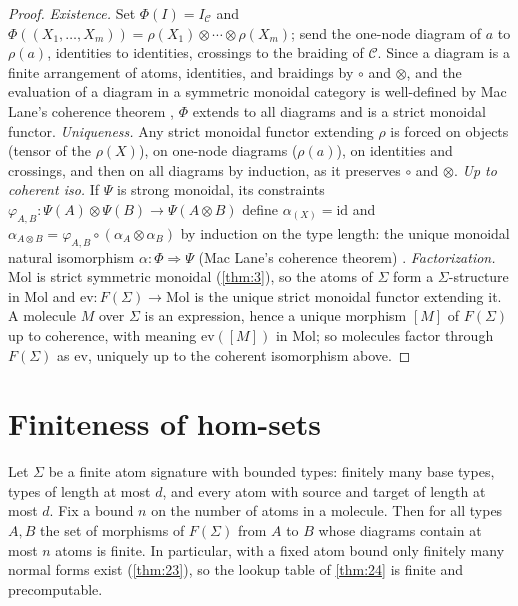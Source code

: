 \begin{proof}
\emph{Existence.} Set $\Phi (I) = I_{\mathcal{C}}$ and
$\Phi ((X_1,\dots,X_m)) = \rho (X_1) \otimes \cdots \otimes \rho (X_m)$; send
the one-node diagram of $a$ to $\rho (a)$, identities to identities, crossings
to the braiding of $\mathcal{C}$. Since a diagram is a finite arrangement of
atoms, identities, and braidings by $\circ$ and $\otimes$, and the evaluation
of a diagram in a symmetric monoidal category is well-defined by Mac Lane's
coherence theorem \cite{maclane}, $\Phi$ extends to all diagrams and is a
strict monoidal functor.
\emph{Uniqueness.} Any strict monoidal functor extending $\rho$ is forced on
objects (tensor of the $\rho (X)$), on one-node diagrams ($\rho (a)$), on
identities and crossings, and then on all diagrams by induction, as it
preserves $\circ$ and $\otimes$.
\emph{Up to coherent iso.} If $\Psi$ is strong monoidal, its constraints
$\varphi_{A,B} \colon \Psi (A) \otimes \Psi (B) \to \Psi (A \otimes B)$ define
$\alpha_{(X)} = \mathrm{id}$ and $\alpha_{A \otimes B} = \varphi_{A,B} \circ
(\alpha_A \otimes \alpha_B)$ by induction on the type length: the unique
monoidal natural isomorphism $\alpha \colon \Phi \Rightarrow \Psi$ (Mac
Lane's coherence theorem) \cite{maclane}.
\emph{Factorization.} Mol is strict symmetric monoidal (\autoref{thm:3}), so the atoms of
$\Sigma$ form a $\Sigma$-structure in Mol and $\mathrm{ev} \colon F (\Sigma)
\to \mathrm{Mol}$ is the unique strict monoidal functor extending it. A
molecule $M$ over $\Sigma$ is an expression, hence a unique morphism $[M]$ of
$F (\Sigma)$ up to coherence, with meaning $\mathrm{ev} ([M])$ in Mol; so
molecules factor through $F (\Sigma)$ as $\mathrm{ev}$, uniquely up to the
coherent isomorphism above.
\end{proof}

\section{Finiteness of hom-sets}\label{sec:free-finite}

\begin{theorem}\label{thm:22}
 Let $\Sigma$ be a finite atom signature with bounded
types: finitely many base types, types of length at most $d$, and every atom
with source and target of length at most $d$. Fix a bound $n$ on the number
of atoms in a molecule. Then for all types $A, B$ the set of morphisms of
$F (\Sigma)$ from $A$ to $B$ whose diagrams contain at most $n$ atoms is
finite. In particular, with a fixed atom bound only finitely many normal
forms exist (\autoref{thm:23}), so the lookup table of \autoref{thm:24} is finite and precomputable.
\end{theorem}

